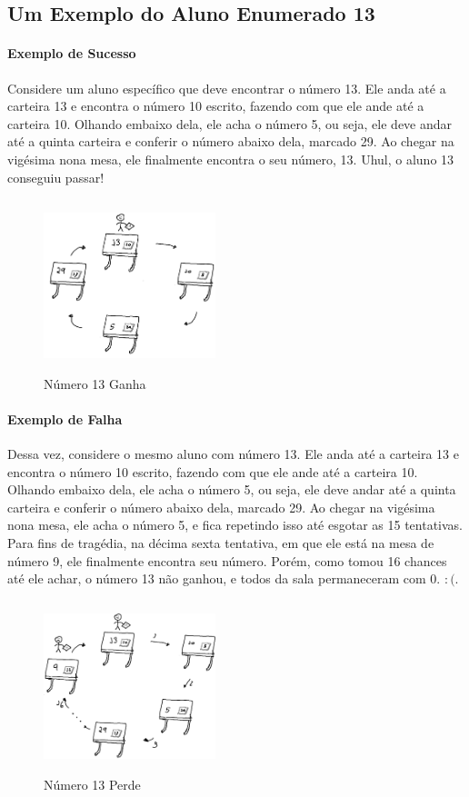 \documentclass{article}
\begin{document}
    \subsection{Um Exemplo do Aluno Enumerado 13}
    \paragraph*{Exemplo de Sucesso}Considere um aluno espec\'ifico que deve encontrar o n\'umero 13. Ele anda at\'e a carteira 13 e encontra o n\'umero 10 escrito, fazendo com que ele ande 
    at\'e a carteira 10. Olhando embaixo dela, ele acha o n\'umero 5, ou seja, ele deve andar at\'e a quinta carteira e conferir o n\'umero abaixo dela, marcado
    29. Ao chegar na vig\'esima nona mesa, ele finalmente encontra o seu n\'umero, 13. Uhul, o aluno 13 conseguiu passar!
    \begin{figure}[h]
        \centering
        \includegraphics[width=5cm, height=5cm]{Win.png}
        \caption{N\'umero 13 Ganha}
    \end{figure}
    
    \paragraph*{Exemplo de Falha}Dessa vez, considere o mesmo aluno com n\'umero 13. Ele anda at\'e a carteira 13 e encontra o n\'umero 10 escrito, fazendo com que ele
    ande at\'e a carteira 10. Olhando embaixo dela, ele acha o n\'umero 5, ou seja, ele deve andar at\'e a quinta carteira e conferir o n\'umero abaixo dela, marcado
    29. Ao chegar na vig\'esima nona mesa, ele acha o n\'umero 5, e fica repetindo isso at\'e esgotar as 15 tentativas. Para fins de trag\'edia, na d\'ecima sexta tentativa,
    em que ele est\'a na mesa de n\'umero 9, ele finalmente encontra seu n\'umero. Por\'em, como tomou 16 chances at\'e ele achar, o n\'umero 13 n\~ao ganhou, e todos da
    sala permaneceram com 0. $:(.$
    \begin{figure}
        \includegraphics[width=5cm, height=5cm]{Lose.png}
        \centering
        \caption{N\'umero 13 Perde}
    \end{figure}
\end{document}

